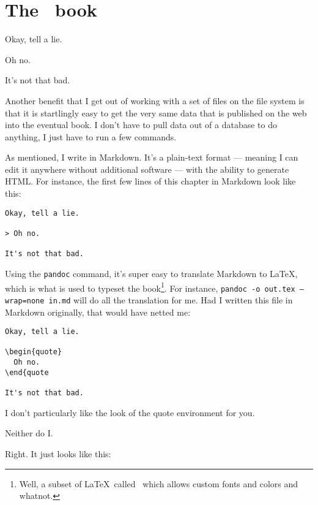 \chapter*{The \allyWord\ book}

\label{book}

\begin{paracol}{2}
\begin{leftcolumn}
Okay, tell a lie.

\begin{ally}
  Oh no.
\end{ally}
It's not that bad.

Another benefit that I get out of working with a set of files on the file system is that it is startlingly easy to get the very same data that is published on the web into the eventual book. I don't have to pull data out of a database to do anything, I just have to run a few commands.

As mentioned, I write in Markdown. It's a plain-text format --- meaning I can edit it anywhere without additional software --- with the ability to generate HTML. For instance, the first few lines of this chapter in Markdown look like this:

\begin{verbatim}
Okay, tell a lie.

> Oh no.

It's not that bad.
\end{verbatim}


Using the \texttt{pandoc} command, it's super easy to translate Markdown to \LaTeX, which is what is used to typeset the book\footnote{Well, a subset of \LaTeX\ called \XeLaTeX\ which allows custom fonts and colors and whatnot.}. For instance, \texttt{pandoc -o out.tex --wrap=none in.md} will do all the translation for me. Had I written this file in Markdown originally, that would have netted me:

\begin{verbatim}
Okay, tell a lie.

\begin{quote}
  Oh no.
\end{quote

It's not that bad.
\end{verbatim}
I don't particularly like the look of the quote environment for you.

\begin{ally}
  Neither do I.
\end{ally}
Right. It just looks like this:


\end{leftcolumn}
\end{paracol}
